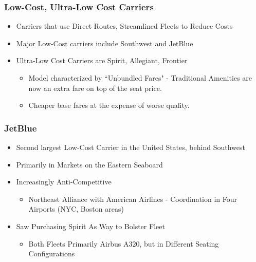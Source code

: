 \documentclass[xcolor=dvipsnames]{beamer}
\begin{document}
	\begin{frame}
		\frametitle{Low-Cost, Ultra-Low Cost Carriers}
		\begin{itemize}
            \item Carriers that use Direct Routes, Streamlined Fleets to Reduce Costs
			\item Major Low-Cost carriers include Southwest and JetBlue
            \item Ultra-Low Cost Carriers are Spirit, Allegiant, Frontier
            \begin{itemize}
                \item Model characterized by ``Unbundled Fares" - Traditional Amenities are now an extra fare on top of the seat price.
                \item Cheaper base fares at the expense of worse quality.
            \end{itemize}
		\end{itemize}
	\end{frame}

    \begin{frame}
        \frametitle{JetBlue}
        \begin{itemize}
            \item Second largest Low-Cost Carrier in the United States, behind Southwest
            \item Primarily in Markets on the Eastern Seaboard
            \item Increasingly Anti-Competitive
            \begin{itemize}
                \item Northeast Alliance with American Airlines - Coordination in Four Airports (NYC, Boston areas)
            \end{itemize}
            \item Saw Purchasing Spirit As Way to Bolster Fleet
            \begin{itemize}
                \item Both Fleets Primarily Airbus A320, but in Different Seating Configurations
            \end{itemize}
        \end{itemize}
    \end{frame}

   
\end{document}

